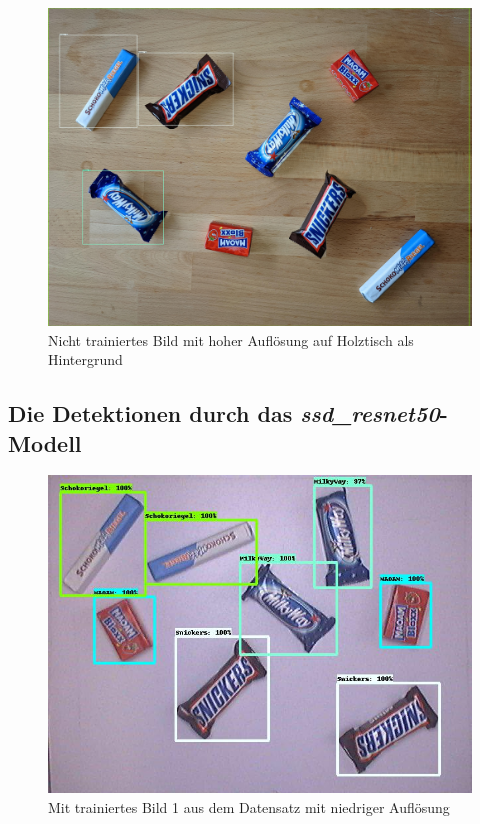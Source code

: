     \begin{figure}[H]
        \centering
        \includegraphics[angle = 90, width = \textwidth]{Bilder/models/model_comparison/ssd_mobilenet_v2_fpnlite_640x640_coco17_tpu-8/HD_on_wood.jpg}
        \caption{Nicht trainiertes Bild mit hoher Auflösung auf Holztisch als Hintergrund}
    \end{figure}
    
    \subsection{Die Detektionen durch das \textit{ssd\_resnet50}-Modell}
    
    \begin{figure}[H]
        \vspace{-5mm}
        \centering
        \includegraphics[angle = 90, height = 0.85\textheight]{Bilder/models/model_comparison/ssd_resnet50_v1_fpn_640x640_coco17_tpu-8/trained_1.jpg}
        \caption{Mit trainiertes Bild 1 aus dem Datensatz mit niedriger Auflösung}
    \end{figure}
    
